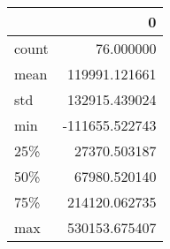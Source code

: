 \begin{tabular}{lr}
\toprule
{} &              0 \\
\midrule
count &      76.000000 \\
mean  &  119991.121661 \\
std   &  132915.439024 \\
min   & -111655.522743 \\
25\%   &   27370.503187 \\
50\%   &   67980.520140 \\
75\%   &  214120.062735 \\
max   &  530153.675407 \\
\bottomrule
\end{tabular}
